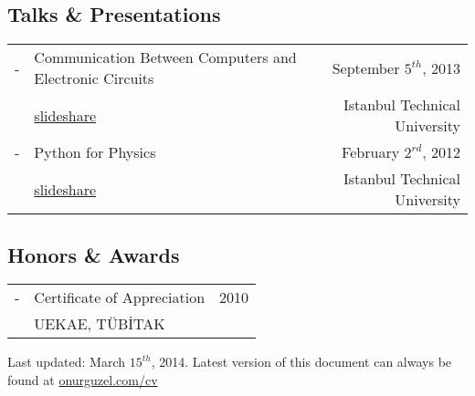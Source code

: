 \documentclass[11pt,a4paper]{article}
\begin{document}
\subsection*{Talks \& Presentations}
\begin{tabularx}{\textwidth}{l X r}
- & Communication Between Computers and Electronic Circuits & September $5^{th}$, 2013\\
& \href{http://www.slideshare.net/onurguzel/bilgisayar-ve-elektronik}{slideshare} & Istanbul Technical University\\
- & Python for Physics & February $2^{rd}$, 2012\\
& \href{http://www.slideshare.net/onurguzel/fizik-icin-python}{slideshare} & Istanbul Technical University
\end{tabularx}

\subsection*{Honors \& Awards}
\begin{tabularx}{\textwidth}{l X r}
- & Certificate of Appreciation & 2010\\
& UEKAE, TÜBİTAK
\end{tabularx}

\vspace{10pt}
\footnotesize {\color[gray]{0.25} Last updated: March $15^{th}$, 2014. Latest version of this document can always be found at \href{http://onurguzel.com/cv}{\color{black}onurguzel.com/cv}}
\end{document}
